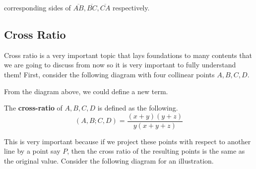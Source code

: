 \documentclass[../../../main.tex]{subfiles}
\begin{document}
corresponding sides of $\overline{AB}, \overline{BC}, \overline{CA}$
respectively.

\subsection{Cross Ratio}

Cross ratio is a very important topic that lays foundations to many
contents that we are going to discuss from now so it is very important
to fully understand them! First, consider the following diagram
with four collinear points $A, B, C, D$.

\begin{figure}[H]
\centering
{}
\end{figure}

From the diagram above, we could define a new term.

\begin{important}
The \textbf{cross-ratio} of $A, B, C, D$ is defined as the following.
\[
(A, B; C, D) = \frac{(x + y) (y + z)}{y (x + y + z)}
\]
\end{important}

This is very important because if we project these points with
respect to another line by a point say $P$, then the cross ratio
of the resulting points is the same as the original value.
Consider the following diagram for an illustration.
\end{document}
